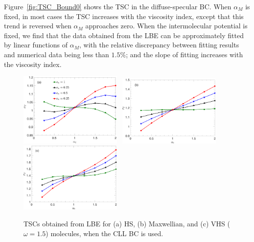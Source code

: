 Figure~\ref{fig:TSC_Bound0} shows the TSC in the diffuse-specular BC. When $\alpha_M$ is fixed, in most cases the TSC increases with the viscosity index, except that this trend is reversed when $\alpha_M$ approaches zero. When the intermolecular potential is fixed, we find that the data obtained from the LBE can be approximately fitted by linear functions of $\alpha_M$, with the relative discrepancy between fitting results and numerical data being less than $1.5\%$; and the slope of fitting increases with the viscosity index. %





\begin{figure}[t]
	\centering
	\includegraphics[width=0.45\textwidth]{SlipJump/IMG/TSC_vs_TMAC_Omega05}\
	\hskip 15pt
	\includegraphics[width=0.45\textwidth]{SlipJump/IMG/TSC_vs_TMAC_Omega1}\\
	\vskip 10pt
	\includegraphics[width=0.45\textwidth]{SlipJump/IMG/TSC_vs_TMAC_Omega1p5}
	\caption{
		TSCs obtained from LBE for (a) HS, (b) Maxwellian, and (c) VHS ($\omega=1.5$) molecules, when the CLL BC is used. 
	}
\label{fig:TSC_Bound}
\end{figure}

